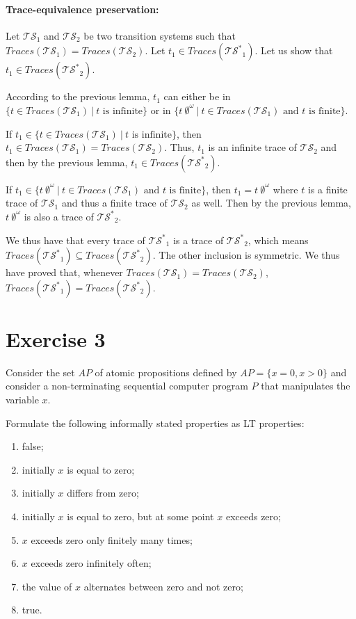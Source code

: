 \documentclass[11pt,a4paper]{article}
\def\ts{\mathcal{TS}}
\def\tss{\mathcal{TS^*}}
\def\traces{\mathit{Traces}}
\begin{document}
\begin{Answer}[number=2]
\paragraph{Trace-equivalence preservation:} Let $\ts_1$ and $\ts_2$ be two transition systems such that $\traces(\ts_1)=\traces(\ts_2)$. Let $t_1\in\traces(\tss_1)$. Let us show that $t_1\in\traces(\tss_2)$.

According to the previous lemma, $t_1$ can either be in $\{t\in\traces(\ts_1)~|~t\text{ is infinite}\}$ or in $\{t\ \emptyset^\omega~|~t\in\traces(\ts_1)\text{ and $t$ is finite}\}$.

If $t_1\in\{t\in\traces(\ts_1)~|~t\text{ is infinite}\}$, then $t_1\in\traces(\ts_1)=\traces(\ts_2)$. Thus, $t_1$ is an infinite trace of $\ts_2$ and then by the previous lemma, $t_1\in\traces(\tss_2)$.

If $t_1\in\{t\ \emptyset^\omega~|~t\in\traces(\ts_1)\text{ and $t$ is finite}\}$, then $t_1=t\ \emptyset^\omega$ where $t$ is a finite trace of $\ts_1$ and thus a finite trace of $\ts_2$ as well. Then by the previous lemma, $t\ \emptyset^\omega$ is also a trace of $\tss_2$.

We thus have that every trace of $\tss_1$ is a trace of $\tss_2$, which means $\traces(\tss_1)\subseteq\traces(\tss_2)$. The other inclusion is symmetric. We thus have proved that, whenever $\traces(\ts_1)=\traces(\ts_2)$, $\traces(\tss_1)=\traces(\tss_2)$.\\
\end{Answer}

\section*{Exercise 3}

Consider the set $AP$ of atomic propositions defined by $AP = \{ x = 0,x > 0 \}$ and consider a non-terminating sequential computer program $P$ that manipulates the variable $x$.

Formulate the following informally stated properties as LT properties:
\begin{enumerate}
\item false;
\item initially $x$ is equal to zero;
\item initially $x$ differs from zero;
\item initially $x$ is equal to zero, but at some point $x$ exceeds zero;
\item $x$ exceeds zero only finitely many times;
\item $x$ exceeds zero infinitely often;
\item the value of $x$ alternates between zero and not zero;
\item true.
\end{enumerate}
\end{document}
